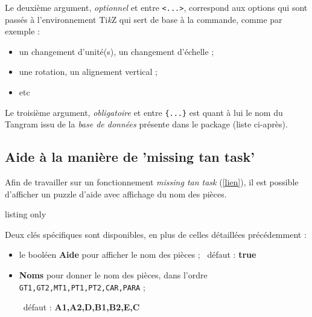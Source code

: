 \documentclass{article}
\providecommand\tikzlogo{Ti\textit{k}Z}
\newcommand\Cle[1]{{\bfseries\sffamily\textlangle #1\textrangle}}
\begin{document}
Le deuxième argument, \textit{optionnel} et entre \texttt{<...>}, correspond aux options qui sont passés à l'environnement \tikzlogo{} qui sert de base à la commande, comme par exemple :

\begin{itemize}
	\item un changement d'unité(s), un changement d'échelle ;
	\item une rotation, un alignement vertical ;
	\item etc
\end{itemize}

Le troisième argument, \textit{obligatoire} et entre \texttt{\{...\}} est quant à lui le nom du Tangram issu de la \textit{base de données} présente dans le package (liste ci-après).

\pagebreak

\subsection{Aide à la manière de 'missing tan task'}

Afin de travailler sur un fonctionnement \textit{missing tan task} (\href{https://www.researchgate.net/publication/371039854_Comparing_Mental_Effort_Difficulty_and_Confidence_Appraisals_in_Problem-Solving_A_Metacognitive_Perspective}{[lien]}), il est possible d'afficher un puzzle d'aide avec affichage du nom des pièces.

\begin{PresentationCode}{listing only}
\end{PresentationCode}

Deux clés spécifiques sont disponibles, en plus de celles détaillées précédemment :

\begin{itemize}
	\item le booléen \Cle{Aide} pour afficher le nom des pièces ; \hfill~défaut : \Cle{true}
	\item \Cle{Noms} pour donner le nom des pièces, dans l'ordre \texttt{GT1,GT2,MT1,PT1,PT2,CAR,PARA} ;
	
	\hfill~défaut : \Cle{A1,A2,D,B1,B2,E,C}
\end{itemize}

\begin{PresentationCode}{}
\TangramTikzAide[Correction]
\end{PresentationCode}
\end{document}
